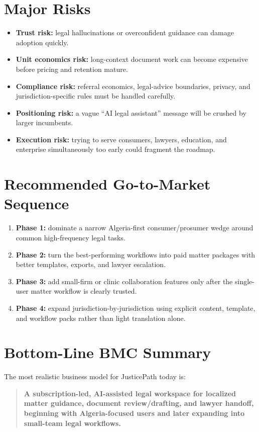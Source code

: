 \documentclass[11pt]{article}
\begin{document}
\section*{Major Risks}
\begin{itemize}
  \item \textbf{Trust risk:} legal hallucinations or overconfident guidance can damage adoption quickly.
  \item \textbf{Unit economics risk:} long-context document work can become expensive before pricing and retention mature.
  \item \textbf{Compliance risk:} referral economics, legal-advice boundaries, privacy, and jurisdiction-specific rules must be handled carefully.
  \item \textbf{Positioning risk:} a vague ``AI legal assistant'' message will be crushed by larger incumbents.
  \item \textbf{Execution risk:} trying to serve consumers, lawyers, education, and enterprise simultaneously too early could fragment the roadmap.
\end{itemize}

\section*{Recommended Go-to-Market Sequence}
\begin{enumerate}[leftmargin=1.4em]
  \item \textbf{Phase 1:} dominate a narrow Algeria-first consumer/prosumer wedge around common high-frequency legal tasks.
  \item \textbf{Phase 2:} turn the best-performing workflows into paid matter packages with better templates, exports, and lawyer escalation.
  \item \textbf{Phase 3:} add small-firm or clinic collaboration features only after the single-user matter workflow is clearly trusted.
  \item \textbf{Phase 4:} expand jurisdiction-by-jurisdiction using explicit content, template, and workflow packs rather than light translation alone.
\end{enumerate}

\section*{Bottom-Line BMC Summary}
The most realistic business model for JusticePath today is:

\begin{quote}
\textbf{A subscription-led, AI-assisted legal workspace for localized matter guidance, document review/drafting, and lawyer handoff, beginning with Algeria-focused users and later expanding into small-team legal workflows.}
\end{quote}
\end{document}

